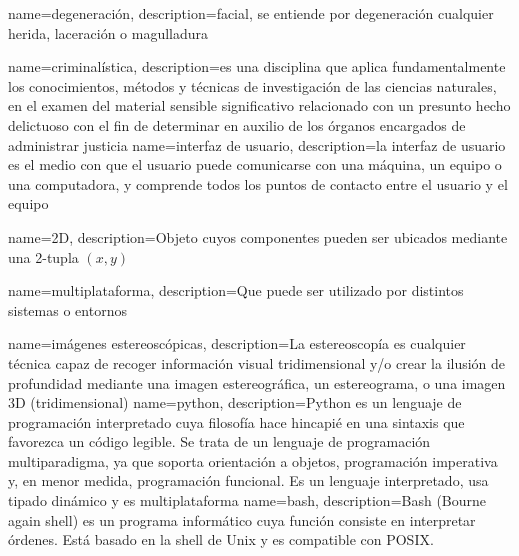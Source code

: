 {
	name=degeneración,
	description={facial, se entiende por degeneración cualquier herida, laceración o magulladura} 
}


{
	name=criminalística,
	description={es una disciplina que aplica fundamentalmente los conocimientos, métodos y técnicas de investigación de las ciencias naturales, en el examen del material sensible significativo relacionado con un presunto hecho delictuoso con el fin de determinar en auxilio de los órganos encargados de administrar justicia} 
}
{
	name=interfaz de usuario,
	description={la interfaz de usuario es el medio con que el usuario puede comunicarse con una máquina, un equipo o una computadora, y comprende todos los puntos de contacto entre el usuario y el equipo} 
}


{
	name=2D,
	description={Objeto cuyos componentes pueden ser ubicados mediante una 2-tupla $(x,y)$} 
}

{
	name=multiplataforma,
	description={Que puede ser utilizado por distintos sistemas o entornos} 
}

{
	name=imágenes estereoscópicas,
	description={La estereoscopía es cualquier técnica capaz de recoger información visual tridimensional y/o crear la ilusión de profundidad mediante una imagen estereográfica, un estereograma, o una imagen \gls{3D} (tridimensional)} 
}
{
	name=python,
	description={Python es un lenguaje de programación interpretado cuya filosofía hace hincapié en una sintaxis que favorezca un código legible. Se trata de un lenguaje de programación multiparadigma, ya que soporta orientación a objetos, programación imperativa y, en menor medida, programación funcional. Es un lenguaje interpretado, usa tipado dinámico y es multiplataforma} 
} 
{
	name=bash,
	description={Bash (Bourne again shell) es un programa informático cuya función consiste en interpretar órdenes. Está basado en la shell de Unix y es compatible con POSIX.} 
} 



